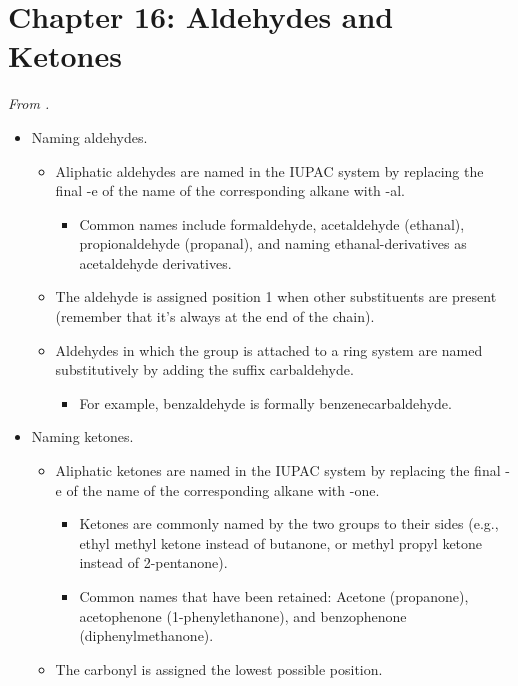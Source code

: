 \documentclass[../notes.tex]{subfiles}
\begin{document}
\section{Chapter 16: Aldehydes and Ketones}
\emph{From \textcite{bib:SolomonsEtAl}.}
\begin{itemize}
    \item {}Naming aldehydes.
    \begin{itemize}
        \item Aliphatic aldehydes are named in the IUPAC system by replacing the final -e of the name of the corresponding alkane with -al.
        \begin{itemize}
            \item Common names include formaldehyde, acetaldehyde (ethanal), propionaldehyde (propanal), and naming ethanal-derivatives as acetaldehyde derivatives.
        \end{itemize}
        \item The aldehyde is assigned position 1 when other substituents are present (remember that it's always at the end of the chain).
        \item Aldehydes in which the  group is attached to a ring system are named substitutively by adding the suffix carbaldehyde.
        \begin{itemize}
            \item For example, benzaldehyde is formally benzenecarbaldehyde.
        \end{itemize}
    \end{itemize}
    \item Naming ketones.
    \begin{itemize}
        \item Aliphatic ketones are named in the IUPAC system by replacing the final -e of the name of the corresponding alkane with -one.
        \begin{itemize}
            \item Ketones are commonly named by the two groups to their sides (e.g., ethyl methyl ketone instead of butanone, or methyl propyl ketone instead of 2-pentanone).
            \item Common names that have been retained: Acetone (propanone), acetophenone (1-phenylethanone), and benzophenone (diphenylmethanone).
        \end{itemize}
        \item The carbonyl is assigned the lowest possible position.
    \end{itemize}

\end{itemize}
\end{document}
